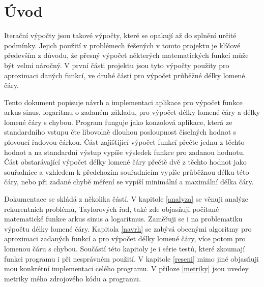 \documentclass[12pt,a4paper,titlepage,final]{article}
\begin{document}

\def\author{Jan Wrona}
\def\email{xwrona00@stud.fit.vutbr.cz}
\def\projname{Iterační výpočty}



\pagestyle{plain}
\setcounter{page}{1}
\tableofcontents

\newpage
\pagestyle{plain}
\setcounter{page}{1}

\section{Úvod} \label{uvod}

Iterační výpočty jsou takové výpočty, které se opakují až do splnění určité
podmínky. Jejich použití v problémech řešených v tomto projektu je klíčové
především z důvodu, že přesný výpočet některých matematických
funkcí může být velmi náročný. V první části projektu jsou tyto výpočty použity
pro aproximaci daných funkcí, ve druhé části pro výpočet průběžné délky lomené
čáry.

Tento dokument popisuje návrh a implementaci aplikace pro výpočet funkce arkus
sinus, logaritmu o zadaném základu, pro výpočet délky lomené čáry a délky
lomené čáry s chybou. Program funguje jako konzolová aplikace, která ze
standardního vstupu čte libovolně dlouhou posloupnost číselných hodnot s plovoucí
řadovou čárkou. Část zajišťijící výpočet funkcí přečte jednu z těchto hodnot
a na standardní výstup vypíše výsledek funkce pro zadanou hodnotu. Část
obstarávající výpočet délky lomené čáry přečtě dvě z těchto hodnot jako
souřadnice a vzhledem k předchozím souřadnicím vypíše průběžnou délku této
čáry, nebo při zadané chybě měření se vypíší minimální a maximální délka čáry.

Dokumentace se skládá z několika částí. V kapitole \ref{analyza} se věnuji analýze
rekurentních problémů, Taylorových řad, také zde objasňuji počítané
matematické funkce arkus sinus a logaritmus. Zaměřuji se i na problematiku
výpočtu délky lomené čáry. Kapitola \ref{navrh} se zabývá obecnými algoritmy
pro aproximaci zadaných funkcí a pro výpočet délky lomené čáry, více potom
pro lomenou čáru s chybou. Součástí této kapitoly je i série testů, které
zkoumají funkci programu i při nesprávném použití. V kapitole
\ref{reseni} mimo jiné objasňuji mou konkrétní implementaci celého programu.
V příloze \ref{metriky} jsou uvedey metriky mého zdrojového kódu a programu.
\end{document}
